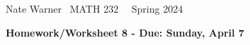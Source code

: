 \documentclass{report}
\title{\Huge{}}
\author{\huge{Nathan Warner}}
\date{\huge{}}
\begin{document}
    \pagebreak \bigbreak \noindent
    Nate Warner \ \quad \quad \quad \quad \quad \quad \quad \quad \quad \quad \quad \quad  MATH 232 \quad  \quad \quad \quad \quad \quad \quad \quad \quad \ \ \quad \quad Spring 2024
    \begin{center}
        \textbf{Homework/Worksheet 8 - Due: Sunday, April 7}
    \end{center}
    \bigbreak \noindent 
\end{document}
